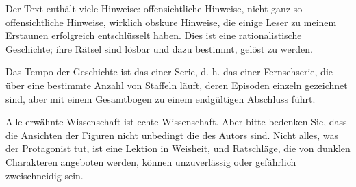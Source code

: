 Der Text enthält viele Hinweise: offensichtliche Hinweise, nicht ganz so
offensichtliche Hinweise, wirklich obskure Hinweise, die einige Leser zu meinem
Erstaunen erfolgreich entschlüsselt haben. Dies ist eine rationalistische
Geschichte; ihre Rätsel sind lösbar und dazu bestimmt, gelöst zu werden.

Das Tempo der Geschichte ist das einer Serie, d. h. das einer Fernsehserie, die
über eine bestimmte Anzahl von Staffeln läuft, deren Episoden einzeln gezeichnet
sind, aber mit einem Gesamtbogen zu einem endgültigen Abschluss führt.

Alle erwähnte Wissenschaft ist echte Wissenschaft. Aber bitte bedenken Sie, dass
die Ansichten der Figuren nicht unbedingt die des Autors sind. Nicht alles, was
der Protagonist tut, ist eine Lektion in Weisheit, und Ratschläge, die von
dunklen Charakteren angeboten werden, können unzuverlässig oder gefährlich
zweischneidig sein.
